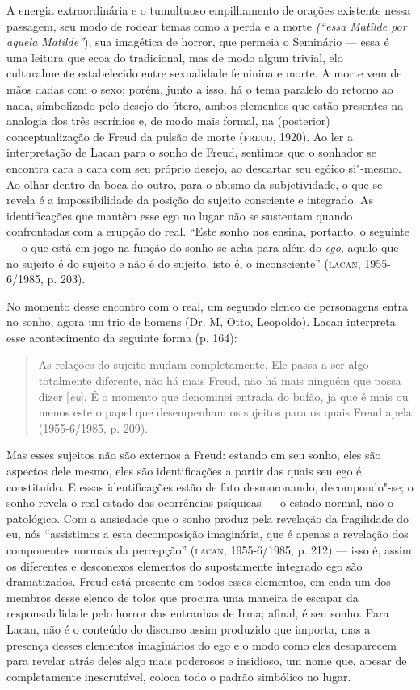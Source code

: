 A energia extraordinária e o tumultuoso empilhamento de orações
existente nessa passagem, seu modo de rodear temas como a perda e a
morte \emph{(``essa Matilde por aquela Matilde''}), sua imagética de
horror, que permeia o Seminário --- essa é uma leitura que ecoa do
tradicional, mas de modo algum trivial, elo culturalmente estabelecido
entre sexualidade feminina e morte. A morte vem de mãos dadas com o
sexo; porém, junto a isso, há o tema paralelo do retorno ao nada,
simbolizado pelo desejo do útero, ambos elementos que estão presentes na
analogia dos três escrínios e, de modo mais formal, na (posterior)
conceptualização de Freud da pulsão de morte (\textsc{freud}, 1920). Ao ler a
interpretação de Lacan para o sonho de Freud, sentimos que o sonhador se
encontra cara a cara com seu próprio desejo, ao descartar seu egóico
si"-mesmo. Ao olhar dentro da boca do outro, para o abismo da
subjetividade, o que se revela é a impossibilidade da posição do sujeito
consciente e integrado. As identificações que mantêm esse ego no lugar
não se sustentam quando confrontadas com a erupção do real. ``Este sonho
nos ensina, portanto, o seguinte --- o que está em jogo na função do sonho
se acha para além do \emph{ego}, aquilo que no sujeito é do sujeito e
não é do sujeito, isto é, o inconsciente'' (\textsc{lacan}, 1955-6/1985, p. 203).

No momento desse encontro com o real, um segundo elenco de personagens
entra no sonho, agora um trio de homens (Dr. M, Otto, Leopoldo). Lacan
interpreta esse acontecimento da seguinte forma (p. 164):

\begin{quote}
As relações do sujeito mudam completamente. Ele passa a ser algo
totalmente diferente, não há mais Freud, não há mais ninguém que possa
dizer {[}\emph{eu}{]}. É o momento que denominei entrada do bufão, já
que é mais ou menos este o papel que desempenham os sujeitos para os
quais Freud apela (1955-6/1985, p. 209).
\end{quote}

Mas esses sujeitos não são externos a Freud: estando em seu sonho, eles
são aspectos dele mesmo, eles são identificações a partir das quais seu
ego é constituído. E essas identificações estão de fato desmoronando,
decompondo"-se; o sonho revela o real estado das ocorrências psíquicas ---
o estado normal, não o patológico. Com a ansiedade que o sonho produz
pela revelação da fragilidade do eu, nós ``assistimos a esta
decomposição imaginária, que é apenas a revelação dos componentes
normais da percepção'' (\textsc{lacan}, 1955-6/1985, p. 212) --- isso é, assim os
diferentes e desconexos elementos do supostamente integrado ego são
dramatizados. Freud está presente em todos esses elementos, em cada um
dos membros desse elenco de tolos que procura uma maneira de escapar da
responsabilidade pelo horror das entranhas de Irma; afinal, é seu sonho.
Para Lacan, não é o conteúdo do discurso assim produzido que importa,
mas a presença desses elementos imaginários do ego e o modo como eles
desaparecem para revelar atrás deles algo mais poderosos e insidioso, um
nome que, apesar de completamente inescrutável, coloca todo o padrão
simbólico no lugar.

